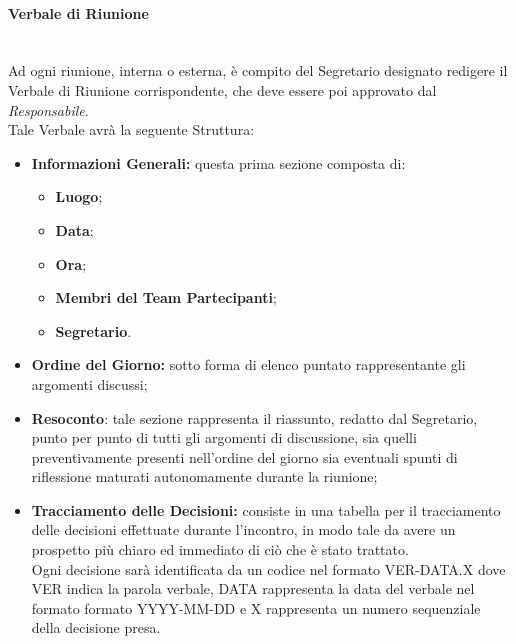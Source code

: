 \paragraph{Verbale di Riunione} ~\\
\label{VdR}
	Ad ogni riunione, interna o esterna, è compito del Segretario designato redigere il Verbale di Riunione 							corrispondente, che deve essere poi approvato dal \textit{Responsabile}.\\
	Tale Verbale avrà la seguente Struttura:
	\begin{itemize}
	\item \textbf{Informazioni Generali:} questa prima sezione composta di:
		\begin{itemize}
		\item \textbf{Luogo};
		\item \textbf{Data};
		\item \textbf{Ora};
		\item \textbf{Membri del Team Partecipanti};
		\item \textbf{Segretario}.
		\end{itemize}
	\item \textbf{Ordine del Giorno:} sotto forma di elenco puntato rappresentante gli argomenti discussi;
	\item \textbf{Resoconto}: tale sezione rappresenta il riassunto, redatto dal Segretario, punto per punto di tutti 		gli argomenti di discussione, sia quelli preventivamente presenti nell'ordine del giorno sia eventuali spunti 				di riflessione maturati autonomamente durante la riunione;
	\item \textbf{Tracciamento delle Decisioni:} consiste in una tabella per il tracciamento delle decisioni effettuate durante l'incontro, in modo tale da avere un prospetto più chiaro ed immediato di ciò che è stato trattato. \\
	Ogni decisione sarà identificata da un codice nel formato VER-DATA.X dove VER indica la parola verbale, DATA rappresenta la data del verbale nel formato formato YYYY-MM-DD e X rappresenta un numero sequenziale della decisione presa.
	
	\end{itemize}
